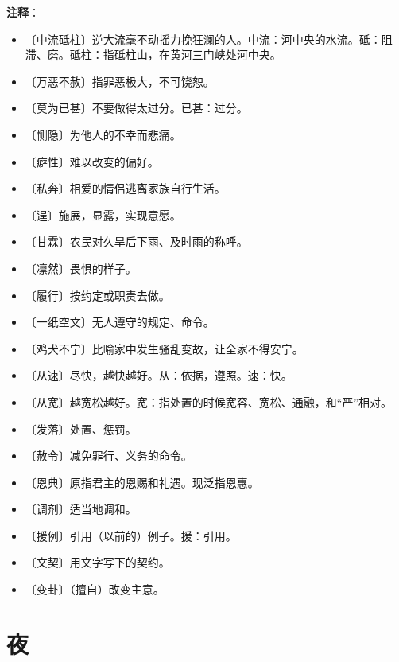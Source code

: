 \documentclass[12pt,UTF-8,openany]{ctexbook}
\begin{document}
\newpage

\textbf{注释}：

\vspace{-1em}

\begin{itemize}
    \setlength\itemsep{-0.2em}
    \item 〔中流砥柱〕逆大流毫不动摇力挽狂澜的人。中流：河中央的水流。砥：阻滞、磨。砥柱：指砥柱山，在黄河三门峡处河中央。
    \item 〔万恶不赦〕指罪恶极大，不可饶恕。
    \item 〔莫为已甚〕不要做得太过分。已甚：过分。
    \item 〔恻隐〕为他人的不幸而悲痛。
    \item 〔癖性〕难以改变的偏好。
    \item 〔私奔〕相爱的情侣逃离家族自行生活。
    \item 〔逞〕施展，显露，实现意愿。
    \item 〔甘霖〕农民对久旱后下雨、及时雨的称呼。
    \item 〔凛然〕畏惧的样子。
    \item 〔履行〕按约定或职责去做。
    \item 〔一纸空文〕无人遵守的规定、命令。
    \item 〔鸡犬不宁〕比喻家中发生骚乱变故，让全家不得安宁。
    \item 〔从速〕尽快，越快越好。从：依据，遵照。速：快。
    \item 〔从宽〕越宽松越好。宽：指处置的时候宽容、宽松、通融，和“严”相对。
    \item 〔发落〕处置、惩罚。
    \item 〔赦令〕减免罪行、义务的命令。
    \item 〔恩典〕原指君主的恩赐和礼遇。现泛指恩惠。
    \item 〔调剂〕适当地调和。
    \item 〔援例〕引用（以前的）例子。援：引用。
    \item 〔文契〕用文字写下的契约。
    \item 〔变卦〕（擅自）改变主意。
\end{itemize}

\chapter{夜}
\end{document}

